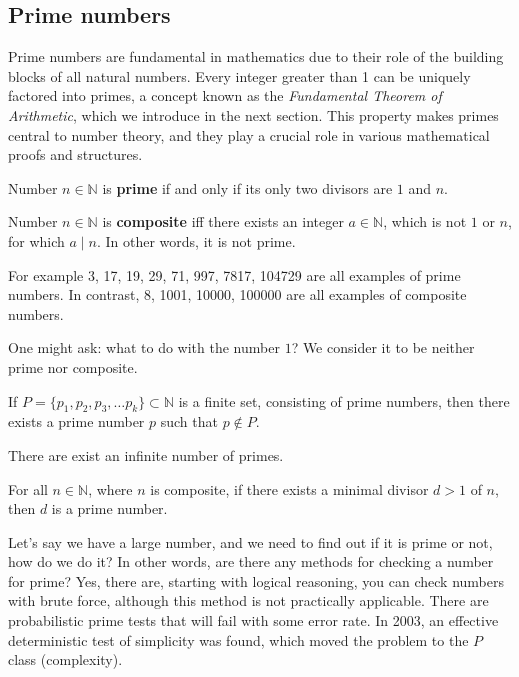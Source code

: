 \documentclass[../lecture-notes-148x210.tex]{subfiles}
\begin{document}
\subsection{Prime numbers}

Prime numbers are fundamental in mathematics due to their role of the building
blocks of all natural numbers. Every integer greater than 1 can be uniquely
factored into primes, a concept known as the \emph{Fundamental Theorem of
Arithmetic}, which we introduce in the next section. This property makes primes
central to number theory, and they play a crucial role in various mathematical
proofs and structures.

\begin{definition}
    Number $n \in \mathbb{N}$ is \textbf{prime} if and only if its only two divisors are $1$
    and $n$. 
\end{definition}

\begin{definition}
    Number $n \in \mathbb{N}$ is \textbf{composite} iff there exists an integer
    $a \in \mathbb{N}$, which is not $1$ or $n$, for which $a \mid n$. In other words,
    it is not prime.
\end{definition}

\begin{example}
    For example 3, 17, 19, 29, 71, 997, 7817, 104729 are all examples of prime numbers.
    In contrast, 8, 1001, 10000, 100000 are all examples of composite numbers.
\end{example}

One might ask: what to do with the number $1$? We consider it to be neither prime 
nor composite.

\begin{theorem} 
    If $P = \{p_1, p_2, p_3, \dots p_k\} \subset \mathbb{N}$ is a finite set,
    consisting of prime numbers, then there exists a prime number $p$ such that
    $p \notin P$.
\end{theorem}

\begin{corollary}
    There are exist an infinite number of primes.
\end{corollary}

\begin{lemma}
    For all $n \in \mathbb{N}$, where $n$ is composite, if there exists a 
    minimal divisor $d>1$ of $n$, then $d$ is a prime number.
\end{lemma}

Let's say we have a large number, and we need to find out if it is prime or not, 
how do we do it? In other words, are there any methods for checking a number for prime?
Yes, there are, starting with logical reasoning, you can check numbers with brute force, although
this method is not practically applicable. There are probabilistic prime tests that will fail
with some error rate. In 2003, an effective deterministic test of simplicity was found, which moved
the problem to the $P$ class (complexity).
\end{document}
